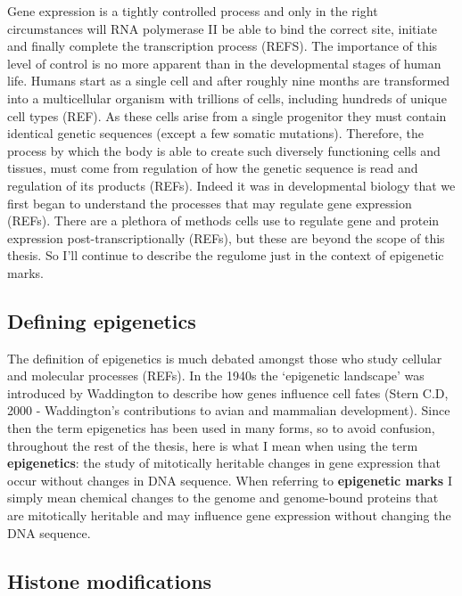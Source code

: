 \documentclass[11pt,twoside]{bristolthesis}
\begin{document}
Gene expression is a tightly controlled process and only in the right circumstances will RNA polymerase II be able to bind the correct site, initiate and finally complete the transcription process (REFS). The importance of this level of control is no more apparent than in the developmental stages of human life. Humans start as a single cell and after roughly nine months are transformed into a multicellular organism with trillions of cells, including hundreds of unique cell types (REF). As these cells arise from a single progenitor they must contain identical genetic sequences (except a few somatic mutations). Therefore, the process by which the body is able to create such diversely functioning cells and tissues, must come from regulation of how the genetic sequence is read and regulation of its products (REFs). Indeed it was in developmental biology that we first began to understand the processes that may regulate gene expression (REFs). There are a plethora of methods cells use to regulate gene and protein expression post-transcriptionally (REFs), but these are beyond the scope of this thesis. So I'll continue to describe the regulome just in the context of epigenetic marks.

\hypertarget{defining-epigenetics}{%
\subsection{Defining epigenetics}\label{defining-epigenetics}}

The definition of epigenetics is much debated amongst those who study cellular and molecular processes (REFs). In the 1940s the `epigenetic landscape' was introduced by Waddington to describe how genes influence cell fates (Stern C.D, 2000 - Waddington's contributions to avian and mammalian development). Since then the term epigenetics has been used in many forms, so to avoid confusion, throughout the rest of the thesis, here is what I mean when using the term \textbf{epigenetics}: the study of mitotically heritable changes in gene expression that occur without changes in DNA sequence. When referring to \textbf{epigenetic marks} I simply mean chemical changes to the genome and genome-bound proteins that are mitotically heritable and may influence gene expression without changing the DNA sequence.

\hypertarget{histone-modifications}{%
\subsection{Histone modifications}\label{histone-modifications}}
\end{document}
